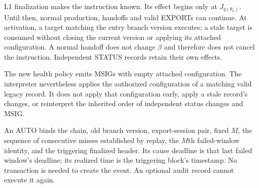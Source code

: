 L1 finalization makes the instruction known. Its effect begins only at
$J_{q(\theta_a)}$. Until then, normal production, handoffs and valid
EXPORTs can continue. At activation, a target matching the entry
branch version executes; a stale target is consumed without closing
the current version or applying its attached configuration. A normal
handoff does not change $\beta$ and therefore does not cancel the
instruction. Independent STATUS records retain their own effects.

The new health policy emits MSIGs with empty attached configuration.
The interpreter nevertheless applies the authorized configuration of
a matching valid legacy record. It does not apply that configuration
early, apply a stale record's changes, or reinterpret the inherited
order of independent status changes and MSIG.

An AUTO binds the chain, old branch version, export-session pair,
fixed $M$, the sequence of consecutive misses established by replay,
the $M$th failed-window identity, and the triggering finalized header.
Its cause deadline is that last failed window's deadline; its realized
time is the triggering block's timestamp. No transaction is needed to
create the event. An optional audit record cannot execute it again.

